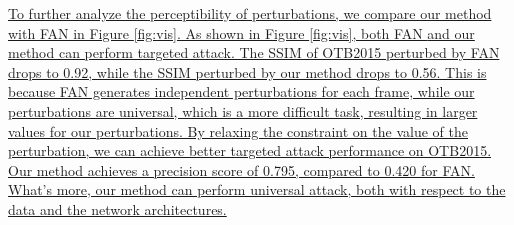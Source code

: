 \documentclass[12pt]{article}
\begin{document}
\uline{
To further analyze the perceptibility of perturbations, we compare our method with FAN in Figure \ref{fig:vis}.
As shown in Figure \ref{fig:vis}, both FAN \cite{FAN} and our method can perform targeted attack. 
The SSIM of OTB2015 perturbed by FAN drops to 0.92, while the SSIM perturbed by our method drops to 0.56.
This is because FAN generates independent perturbations for each frame, while our perturbations are universal, which is a more difficult task, resulting in larger values for our perturbations.
By relaxing the constraint on the value of the perturbation, we can achieve better targeted attack performance on OTB2015.
Our method achieves a precision score of 0.795, compared to 0.420 for FAN.
What's more, our method can perform universal attack, both with respect to the data and the network architectures.}

\end{document}
